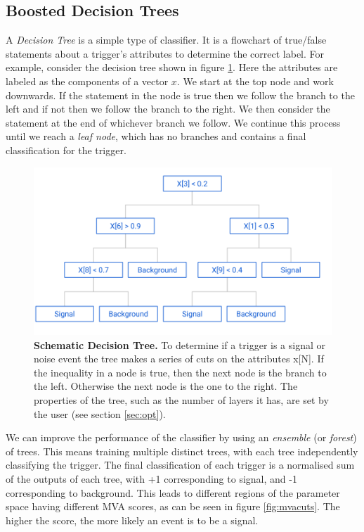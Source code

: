 \documentclass[11pt]{cuthesis}
\begin{document}
\subsection{Boosted Decision Trees} \label{bdt}
A \textit{Decision Tree} is a simple type of classifier. It is a flowchart of true/false statements about a trigger's attributes to determine the correct label. For example, consider the decision tree shown in figure \ref{fig:tree}. Here the attributes are labeled as the components of a vector $x$. We start at the top node and work downwards. If the statement in the node is true then we follow the branch to the left and if not then we follow the branch to the right. We then consider the statement at the end of whichever branch we follow. We continue this process until we reach a \textit{leaf node}, which has no branches and contains a final classification for the trigger.  
\begin{figure} %
\begin{center}
\includegraphics[width=0.8\linewidth]{decision_tree.png}
\end{center}
\caption{\textbf{Schematic Decision Tree.} To determine if a trigger is a signal or noise event the tree makes a series of cuts on the attributes x[N]. If the inequality in a node is true, then the next node is the branch to the left. Otherwise the next node is the one to the right. The properties of the tree, such as the number of layers it has, are set by the user (see section \ref{sec:opt}). }
\label{fig:tree}
\end{figure}

We can improve the performance of the classifier by using an \textit{ensemble} (or \textit{forest}) of trees. This means training multiple distinct trees, with each tree independently classifying the trigger. The final classification of each trigger is a normalised sum of the outputs of each tree, with +1 corresponding to signal, and -1 corresponding to background. This leads to different regions of the parameter space having different MVA scores, as can be seen in figure \ref{fig:mvacuts}. The higher the score, the more likely an event is to be a signal. 
\end{document}

